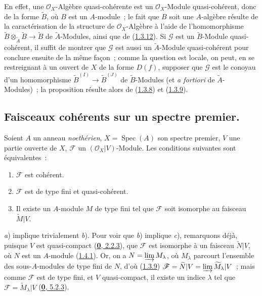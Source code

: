 En effet, une $\mathscr{O}_X$-Algèbre quasi-cohérente est un
$\mathscr{O}_X$-Module quasi-cohérent, donc de la forme $\widetilde{B}$, où
$B$ est un $A$-module~; le fait que $B$ soit une $A$-algèbre résulte de la
caractérisation de la structure de $\mathscr{O}_X$-Algèbre à l'aide de
l'homomorphisme
$\widetilde{B}\otimes_{\widetilde{A}}\widetilde{B}\to\widetilde{B}$ de
$\widetilde{A}$-Modules, ainsi que de
(\hyperref[I.1.3.12-fr]{1.3.12}). Si $\mathscr{G}$ est un
$\widetilde{B}$-Module quasi-cohérent, il suffit de montrer que $\mathscr{G}$
est aussi un $\widetilde{A}$-Module quasi-cohérent pour conclure ensuite de
la même façon~; comme la question est locale, on peut, en se restreignant à
un ouvert de $X$ de la forme $D(f)$, supposer que $\mathscr{G}$ est le
conoyau d'un homomorphisme
$\widetilde{B}^{(I)}\to\widetilde{B}^{(J)}$ de $\widetilde{B}$-Modules (et
\emph{a fortiori} de $\widetilde{A}$-Modules)~; la proposition résulte alors
de (\hyperref[I.1.3.8-fr]{1.3.8}) et
(\hyperref[I.1.3.9-fr]{1.3.9}).

\subsection{Faisceaux cohérents sur un spectre premier.}
\label{subsection:I.1.5-fr}

\begin{theorem}[1.5.1]
\label{I.1.5.1-fr}
Soient $A$ un anneau \emph{noethérien}, $X=\operatorname{Spec}(A)$ son spectre
premier, $V$ une partie ouverte de $X$, $\mathscr{F}$ un
$(\mathscr{O}_X|V)$-Module. Les conditions suivantes sont équivalentes~:
\begin{enumerate}
  \item[\textup{a)}] $\mathscr{F}$ est cohérent.
  \item[\textup{b)}] $\mathscr{F}$ est de type fini et quasi-cohérent.
  \item[\textup{c)}] Il existe un $A$-module $M$ de type fini tel que
  $\mathscr{F}$ soit isomorphe au faisceau $\widetilde{M}|V$.
\end{enumerate}
\end{theorem}

\textit{a}) implique trivialement \textit{b}). Pour voir que \textit{b})
implique \textit{c}), remarquons déjà, puisque $V$ est quasi-compact
(\hyperref[0.2.2.3-fr]{\textbf{0}, 2.2.3}), que $\mathscr{F}$ est isomorphe à un
faisceau $\widetilde{N}|V$, où $N$ est un $A$-module
(\hyperref[I.1.4.1-fr]{1.4.1}). Or, on a
$N=\varinjlim M_\lambda$, où $M_\lambda$ parcourt l'ensemble des
sous-$A$-modules de type fini de $N$, d'où
(\hyperref[I.1.3.9-fr]{1.3.9})
$\mathscr{F}=\widetilde{N}|V=\varinjlim\widetilde{M}_\lambda|V$~; mais comme
$\mathscr{F}$ est de type fini, et $V$ quasi-compact, il existe un indice
$\lambda$ tel que $\mathscr{F}=\widetilde{M}_\lambda|V$
(\hyperref[0.5.2.3-fr]{\textbf{0}, 5.2.3}).

